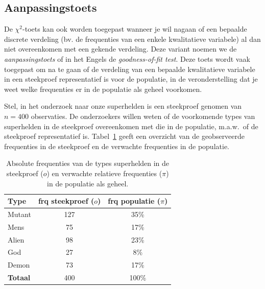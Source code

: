 \subsection{Aanpassingstoets}
\label{ssec:aanpassingstoets}

De $\chi^2$-toets kan ook worden toegepast wanneer je wil nagaan of een bepaalde discrete verdeling (bv. de frequenties van een enkele kwalitatieve variabele) al dan niet overeenkomen met een gekende verdeling. Deze variant noemen we de \emph{aanpassingstoets} of in het Engels de \emph{goodness-of-fit test}. Deze toets wordt vaak toegepast om na te gaan of de verdeling van een bepaalde kwalitatieve variabele in een steekproef representatief is voor de populatie, in de veronderstelling dat je weet welke frequenties er in de populatie als geheel voorkomen.

Stel, in het onderzoek naar onze superhelden is een steekproef genomen van $n = 400$ observaties. De onderzoekers willen weten of de voorkomende types van superhelden in de steekproef overeenkomen met die in de populatie, m.a.w.~of de steekproef representatief is. Tabel~\ref{tab:frequenties-types-superhelden} geeft een overzicht van de geobserveerde frequenties in de steekproef en de verwachte frequenties in de populatie.

\begin{table}
  \centering
  \begin{tabular}{@{}lcc@{}}
  	\toprule
  	\textbf{Type}   & \textbf{frq steekproef ($o$)} & \textbf{frq populatie ($\pi$)} \\
  	\midrule
  	Mutant          &              127              &              35\%              \\
  	Mens            &              75               &              17\%              \\
  	Alien           &              98               &              23\%              \\
  	God             &              27               &              8\%               \\
  	Demon           &              73               &              17\%              \\
  	\midrule
  	\textbf{Totaal} &              400              &             100\%
  \end{tabular}
  \caption{Absolute frequenties van de types superhelden in de steekproef ($o$) en verwachte relatieve frequenties ($\pi$) in de populatie als geheel.}
  \label{tab:frequenties-types-superhelden}
\end{table}

